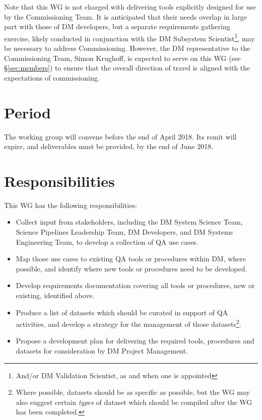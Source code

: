 \documentclass[DM,lsstdraft,toc]{lsstdoc}
\begin{document}
Note that this WG is not charged with delivering tools explicitly designed for
use by the Commissioning Team. It is anticipated that their needs overlap in
large part with those of DM developers, but a separate requirements gathering
exercise, likely conducted in conjunction with the DM Subsystem
Scientist\footnote{And/or DM Validation Scientist, as and when one is
appointed}, may be necessary to address Commissioning. However, the DM
representative to the Commissioning Team, Simon Krughoff, is expected to serve
on this WG (see \S\ref{sec:members}) to ensure that the overall direction of
travel is aligned with the expectations of commissioning.

\section{Period}
\label{sec:period}

The working group will convene before the end of April 2018. Its remit will
expire, and deliverables must be provided, by the end of June 2018.

\section{Responsibilities}

This WG has the following responsibilities:

\begin{itemize}

  \item{Collect input from stakeholders, including the DM System Science Team,
  Science Pipelines Leadership Team, DM Developers, and DM Systems Engineering
  Team, to develop a collection of QA use cases.}

  \item{Map those use cases to existing QA tools or procedures within DM,
  where possible, and identify where new tools or procedures need to be
  developed.}

  \item{Develop requirements documentation covering all tools or procedures,
  new or existing, identified above.}

  \item{Produce a list of datasets which should be curated in support of QA
  activities, and develop a strategy for the management of those
  datasets\footnote{Where possible, datasets should be as specific as
  possible, but the WG may also suggest certain \textit{types} of dataset
  which should be compiled after the WG has been completed.}.}

  \item{Propose a development plan for delivering the required tools,
  procedures and datasets for consideration by DM Project Management.}

\end{itemize}
\end{document}
